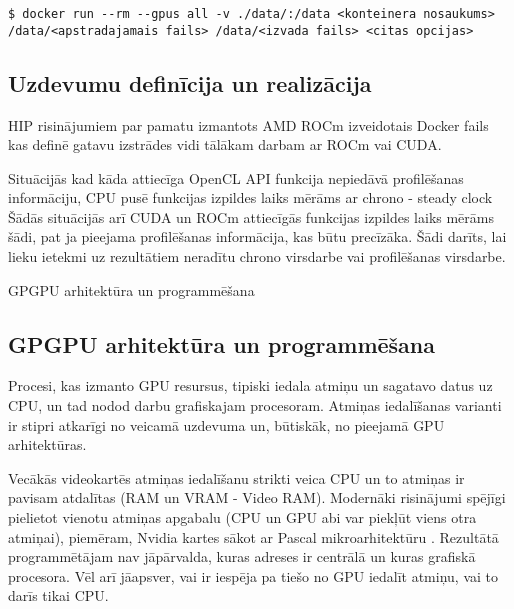 \documentclass[12pt]{report}%
\theoremstyle{definition}
\begin{document}
\begin{lstlisting}[caption={Docker konteinera palaišana un konfigurācija},
  label=lst:docker_konteinera_palaisanas piemers,
  captionpos=t
]
$ docker run --rm --gpus all -v ./data/:/data <konteinera nosaukums> /data/<apstradajamais fails> /data/<izvada fails> <citas opcijas>
\end{lstlisting}




\begin{center}
    \chapter{Uzdevumu definīcija un realizācija}
\end{center}

HIP risinājumiem par pamatu izmantots AMD ROCm izveidotais Docker fails \cite{hip-lib-docker}
kas definē gatavu izstrādes vidi tālākam darbam ar ROCm vai CUDA.



Situācijās kad kāda attiecīga OpenCL API funkcija nepiedāvā profilēšanas informāciju, CPU pusē funkcijas izpildes laiks mērāms ar chrono - steady clock 
Šādās situācijās arī CUDA un ROCm attiecīgās funkcijas izpildes laiks mērāms šādi, pat ja pieejama profilēšanas informācija, kas būtu precīzāka.
Šādi darīts, lai lieku ietekmi uz rezultātiem neradītu chrono virsdarbe vai profilēšanas virsdarbe.

GPGPU arhitektūra un programmēšana
\begin{center}
\chapter{GPGPU arhitektūra un programmēšana}
\end{center}

Procesi, kas izmanto GPU resursus, tipiski iedala atmiņu un sagatavo datus uz CPU, un tad nodod darbu
grafiskajam procesoram. Atmiņas iedalīšanas varianti ir stipri atkarīgi no veicamā uzdevuma un, būtiskāk, no
pieejamā GPU arhitektūras.

Vecākās videokartēs atmiņas iedalīšanu strikti veica CPU un to atmiņas ir pavisam atdalītas 
(RAM un VRAM - Video RAM). Modernāki risinājumi spējīgi pielietot vienotu
atmiņas apgabalu (CPU un GPU abi var piekļūt viens otra atmiņai), piemēram, Nvidia kartes sākot ar Pascal
mikroarhitektūru \cite{nvidia_tesla_p100}. Rezultātā programmētājam nav jāpārvalda,
kuras adreses ir centrālā un kuras grafiskā procesora. Vēl arī jāapsver, vai ir iespēja pa tiešo no GPU
iedalīt atmiņu, vai to darīs tikai CPU.
\end{document}
